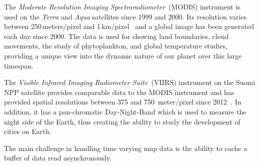 \documentclass[journal]{vgtc}                %
\begin{document}
The \emph{Moderate Resolution Imaging Spectroradiometer}~(MODIS) instrument is used on the \emph{Terra} and \emph{Aqua} satellites since 1999 and 2000.
Its resolution varies between 250\,meters/pixel and 1\,km/pixel~\cite{salomonson1989modis, justice2002overview} and a global image has been generated each day since 2000.
The data is used for showing land boundaries, cloud movements, the study of phytoplankton, and global temperature studies, providing a unique view into the dynamic nature of our planet over this large timespan.

The \emph{Visible Infrared Imaging Radiometer Suite}~(VIIRS) instrument on the Suomi NPP satellite provides comparable data to the MODIS instrument and has provided spatial resolutions between 375 and 750 \,meter/pixel since 2012~\cite{schueler2002npoess}.
In addition, it has a pan-chromatic Day-Night-Band which is used to measure the night side of the Earth, thus creating the ability to study the development of cities on Earth.

The main challenge in handling time varying map data is the ability to cache a buffer of data read asynchronously.
\end{document}
